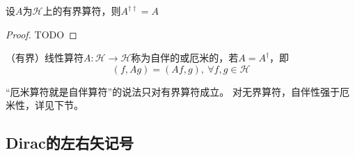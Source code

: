 \begin{theorem}
    设$A$为$\mathscr{H}$上的有界算符，则$A^{\dagger\dagger} = A$
\end{theorem}

\begin{proof}
    TODO
\end{proof}

\begin{definition}
    （有界）线性算符$A \colon \mathscr{H} \to \mathscr{H}$称为自伴的或厄米的，若$A = A^\dagger$，即
    $$(f, Ag) = (Af, g), ~ \forall f, g \in \mathscr{H}$$
\end{definition}

\begin{note}
    ``厄米算符就是自伴算符''的说法只对有界算符成立。
    对无界算符，自伴性强于厄米性，详见下节。
\end{note}

\subsection{Dirac的左右矢记号}


